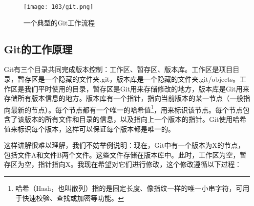 \begin{figure}[ht]
  \centering
  \texttt{[image: 103/git.png]}
  \caption{一个典型的Git工作流程}
  \label{fig:git-workflow}
\end{figure}

\subsection{Git的工作原理}

Git有三个目录共同完成版本控制：工作区、暂存区、版本库。工作区是项目目录，暂存区是一个隐藏的文件夹.git，版本库是一个隐藏的文件夹.git/objects。工作区是我们平时使用的目录，暂存区是Git用来存储修改的地方，版本库是Git用来存储所有版本信息的地方。版本库有一个指针，指向当前版本的某一节点（一般指向最新的节点）。每个节点都有一个唯一的哈希值\footnote{哈希（Hash，也叫散列）指的是固定长度、像指纹一样的唯一小串字符，可用于快速校验、查找或加密等功能。}，用来标识该节点。每个节点包含了该版本的所有文件和目录的信息，以及指向上一个版本的指针。Git使用哈希值来标识每个版本，这样可以保证每个版本都是唯一的。

这样讲解很难以理解，我们不妨举例说明：现在，Git中有一个版本为X的节点，包括文件A和文件B两个文件。这些文件存储在版本库中。此时，工作区为空，暂存区为空，指针指向X。我现在希望对它们进行修改，这个修改遵循以下过程：

